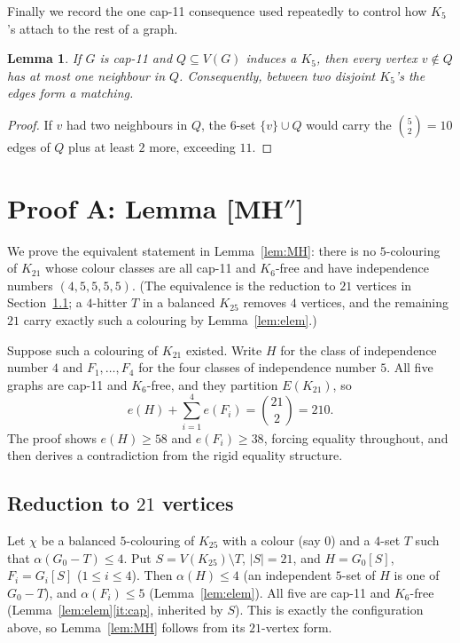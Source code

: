 \documentclass[11pt,reqno]{amsart}
\newtheorem{lemma}[theorem]{Lemma}
\theoremstyle{definition}
\theoremstyle{remark}
\newcommand{\abs}[1]{\left|#1\right|}
\newcommand{\capeleven}{\textsf{cap-11}}
\begin{document}
Finally we record the one \capeleven{} consequence used repeatedly to control how
$K_5$'s attach to the rest of a graph.

\begin{lemma}\label{lem:K5indeg}
If $G$ is \capeleven{} and $Q\subseteq V(G)$ induces a $K_5$, then every vertex
$v\notin Q$ has at most one neighbour in $Q$. Consequently, between two disjoint
$K_5$'s the edges form a matching.
\end{lemma}

\begin{proof}
If $v$ had two neighbours in $Q$, the $6$-set $\{v\}\cup Q$ would carry the
$\binom 52=10$ edges of $Q$ plus at least $2$ more, exceeding $11$.
\end{proof}

\section{Proof A: Lemma \textsf{[MH\texorpdfstring{$''$}{''}]}}\label{sec:MH}

We prove the equivalent statement in Lemma~\ref{lem:MH}: there is no
$5$-colouring of $K_{21}$ whose colour classes are all \capeleven{} and $K_6$-free
and have independence numbers $(4,5,5,5,5)$. (The equivalence is the reduction to
$21$ vertices in Section~\ref{ssec:MH-reduce}; a $4$-hitter $T$ in a balanced
$K_{25}$ removes $4$ vertices, and the remaining $21$ carry exactly such a
colouring by Lemma~\ref{lem:elem}.)

Suppose such a colouring of $K_{21}$ existed. Write $H$ for the class of
independence number $4$ and $F_1,\dots,F_4$ for the four classes of independence
number $5$. All five graphs are \capeleven{} and $K_6$-free, and they partition
$E(K_{21})$, so
\begin{equation}\label{eq:MH-partition}
  e(H)+\sum_{i=1}^4 e(F_i)=\binom{21}{2}=210 .
\end{equation}
The proof shows $e(H)\ge 58$ and $e(F_i)\ge 38$, forcing equality throughout, and
then derives a contradiction from the rigid equality structure.

\subsection{Reduction to $21$ vertices}\label{ssec:MH-reduce}
Let $\chi$ be a balanced $5$-colouring of $K_{25}$ with a colour (say $0$) and a
$4$-set $T$ such that $\alpha(G_0-T)\le 4$. Put $S=V(K_{25})\setminus T$,
$\abs S=21$, and $H=G_0[S]$, $F_i=G_i[S]$ ($1\le i\le 4$). Then $\alpha(H)\le 4$
(an independent $5$-set of $H$ is one of $G_0-T$), and $\alpha(F_i)\le 5$
(Lemma~\ref{lem:elem}). All five are \capeleven{} and $K_6$-free
(Lemma~\ref{lem:elem}\ref{it:cap}, inherited by $S$). This is exactly the
configuration above, so Lemma~\ref{lem:MH} follows from its $21$-vertex form.
\end{document}
